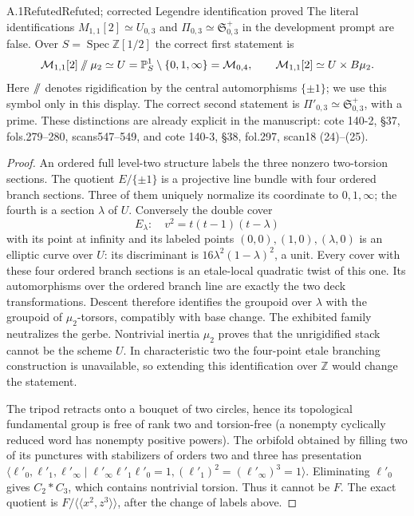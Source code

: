 \begin{claim}{A.1}{Refuted}{Refuted; corrected Legendre identification proved}
The literal identifications $M_{1,1}[2]\simeq U_{0,3}$ and $\Pi_{0,3}\simeq\mathfrak S^+_{0,3}$ in the development prompt are false. Over $S=\operatorname{Spec}\mathbb Z[1/2]$ the correct first statement is
\[
 \mathcal M_{1,1}[2]\mathbin{/\mkern-6mu/}\mu_2\simeq
 U=\mathbb P^1_S\setminus\{0,1,\infty\}=\mathcal M_{0,4},
 \qquad \mathcal M_{1,1}[2]\simeq U\times B\mu_2.
\]
Here $/\mkern-6mu/$ denotes rigidification by the central automorphisms $\{\pm1\}$; we use this symbol only in this display. The correct second statement is $\Pi'_{0,3}\simeq\mathfrak S^+_{0,3}$, with a prime. These distinctions are already explicit in the manuscript: cote 140-2, \S37, fols.279--280, scans547--549, and cote 140-3, \S38, fol.297, scan18 (24)--(25).

\end{claim}
\begin{proof}
An ordered full level-two structure labels the three nonzero two-torsion sections. The quotient $E/\{\pm1\}$ is a projective line bundle with four ordered branch sections. Three of them uniquely normalize its coordinate to $0,1,\infty$; the fourth is a section $\lambda$ of $U$. Conversely the double cover
\[
 E_\lambda:\quad v^2=t(t-1)(t-\lambda)
\]
with its point at infinity and its labeled points $(0,0),(1,0),(\lambda,0)$ is an elliptic curve over $U$: its discriminant is $16\lambda^2(1-\lambda)^2$, a unit. Every cover with these four ordered branch sections is an etale-local quadratic twist of this one. Its automorphisms over the ordered branch line are exactly the two deck transformations. Descent therefore identifies the groupoid over $\lambda$ with the groupoid of $\mu_2$-torsors, compatibly with base change. The exhibited family neutralizes the gerbe. Nontrivial inertia $\mu_2$ proves that the unrigidified stack cannot be the scheme $U$. In characteristic two the four-point etale branching construction is unavailable, so extending this identification over $\mathbb Z$ would change the statement.

The tripod retracts onto a bouquet of two circles, hence its topological fundamental group is free of rank two and torsion-free (a nonempty cyclically reduced word has nonempty positive powers). The orbifold obtained by filling two of its punctures with stabilizers of orders two and three has presentation
$\langle\ell'_0,\ell'_1,\ell'_\infty\mid
\ell'_\infty\ell'_1\ell'_0=1,(\ell'_1)^2=(\ell'_\infty)^3=1\rangle$.
Eliminating $\ell'_0$ gives $C_2*C_3$, which contains nontrivial torsion. Thus it cannot be $F$. The exact quotient is $F/\langle\!\langle x^2,z^3\rangle\!\rangle$, after the change of labels above.
\end{proof}

